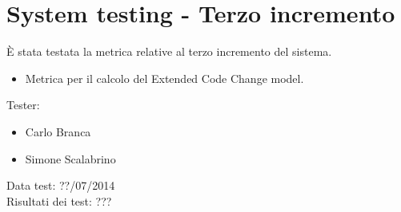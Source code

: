 \section{System testing - Terzo incremento}
È stata testata la metrica relative al terzo incremento del sistema.
\begin{itemize}
 \item Metrica per il calcolo del Extended Code Change model.
\end{itemize}
Tester:
\begin{itemize}
\item Carlo Branca
\item Simone Scalabrino
\end{itemize}
Data test: ??/07/2014\\
Risultati dei test: ???